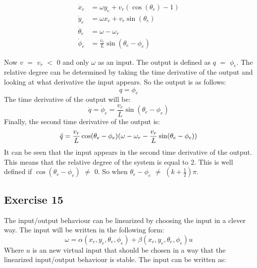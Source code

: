 \begin{align}
    \dot{x}_e &= \omega y_e + v_r (\cos(\theta_e) -1) \label{eq:ex14_dotx}\\
    \dot{y}_e &= \omega x_e + v_r \sin(\theta_e) \label{eq:ex14_doty}\\
    \dot{\theta}_e &= \omega - \omega_r \label{eq:ex14_dottheta}\\
    \dot{\phi}_e &= \frac{v_r}{L}\sin(\theta_e - \phi_e) \label{eq:ex14_dotphi}
\end{align}

Now $v$ $=$ $v_r$ $<$ $0$ and only $\omega$ as an input. The output is defined as $q$ $=$ $\phi_e$. The relative degree can be determined by taking the time derivative of the output and looking at what derivative the input appears. So the output is as follows:
\begin{equation}
    q = \phi_e
    \label{eq:ex14_q}
\end{equation}
The time derivative of the output will be:
\begin{equation}
    \dot{q} = \dot{\phi}_e = \frac{v_r}{L}\sin(\theta_e - \phi_e)
    \label{eq:ex14_qdot}
\end{equation}
Finally, the second time derivative of the output is:
\begin{equation}
    \Ddot{q} = \frac{v_r}{L} \cos(\theta_e - \phi_e) ( \omega - \omega_r - \frac{v_r}{L} \sin(\theta_e - \phi_e))
    \label{eq:ex14_qddot}
\end{equation}
It can be seen that the input appears in the second time derivative of the output. This means that the relative degree of the system is equal to 2. This is well defined if $\cos(\theta_e - \phi_e)$ $\neq$ $0$. So when $\theta_e - \phi_e$ $\neq$ $(k + \frac{1}{2}) \pi$.


\subsection{Exercise 15}

The input/output behaviour can be linearized by choosing the input in a clever way. The input will be written in the following form:
\begin{equation}
    \omega = \alpha(x_e, y_e, \theta_e, \phi_e) + \beta(x_e, y_e, \theta_e, \phi_e) u
    \label{eq:ex15_w}
\end{equation}
Where $u$ is an new virtual input that should be chosen in a way that the linearized input/output behaviour is stable. The input can be written as:

